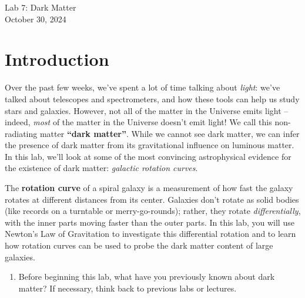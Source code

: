 \documentclass[11pt]{article}%
\begin{document}
\begin{center}
\huge{Lab 7: Dark Matter}\\ \medskip \Large{October 30, 2024}
\end{center}

\section{Introduction}

\noindent
Over the past few weeks, we've spent a lot of time talking about \emph{light}: we've talked about telescopes and spectrometers, and how these tools can help us study stars and galaxies. However, not all of the matter in the Universe emits light -- indeed, \emph{most} of the matter in the Universe doesn't emit light! We call this non-radiating matter \textbf{``dark matter''}. While we cannot see dark matter, we can infer the presence of dark matter from its gravitational influence on luminous matter. In this lab, we'll look at some of the most convincing astrophysical evidence for the existence of dark matter: \textit{galactic rotation curves}.

\medskip \noindent
The \textbf{rotation curve} of a spiral galaxy is a measurement of how fast the galaxy rotates at different distances from its center.  Galaxies don't rotate as solid bodies (like records on a turntable or merry-go-rounds); rather, they rotate \textit{differentially}, with the inner parts moving faster than the outer parts. In this lab, you will use Newton's Law of Gravitation to investigate this differential rotation and to learn how rotation curves can be used to probe the dark matter content of large galaxies.

\begin{enumerate}
\setcounter{enumi}{0}
    \item Before beginning this lab, what have you previously known about dark matter? If necessary, think back to previous labs or lectures.
    
\end{enumerate}

\end{document}
